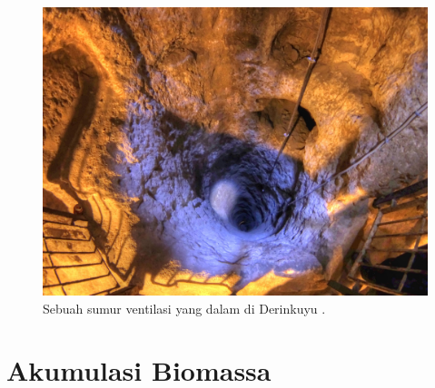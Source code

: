 \documentclass[10pt,twocolumn,letterpaper]{article}
\begin{document}
\begin{figure}[t]
\begin{center}
   \includegraphics[width=1\linewidth]{derinkuyu-air.jpg}
\end{center}
   \caption{Sebuah sumur ventilasi yang dalam di Derinkuyu \cite{53}.}
\label{fig:6}
\label{fig:onecol}
\end{figure}


\section{Akumulasi Biomassa}
\end{document}
